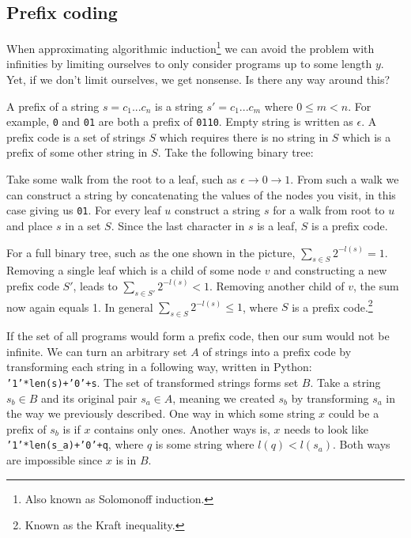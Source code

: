 \newpage

\subsection{Prefix coding} 

When approximating algorithmic induction\footnote{Also known as Solomonoff induction.} we can avoid the problem with infinities by limiting ourselves to only consider programs up to some length $y$.
Yet, if we don't limit ourselves, we get nonsense.
Is there any way around this?

A prefix of a string $s = c_1...c_n$ is a string $s' = c_1...c_m$ where $0 \leq m < n$.
For example, \texttt{0} and \texttt{01} are both a prefix of \texttt{0110}.
Empty string is written as $\epsilon$.
A prefix code is a set of strings $S$ which requires there is no string in $S$ which is a prefix of some other string in $S$.
Take the following binary tree:

\begin{figure}[h]
	\centering
{}
\end{figure}

Take some walk from the root to a leaf, such as $\epsilon \rightarrow 0 \rightarrow 1$.
From such a walk we can construct a string by concatenating the values of the nodes you visit, in this case giving us \texttt{01}.
For every leaf $u$ construct a string $s$ for a walk from root to $u$ and place $s$ in a set $S$.
Since the last character in $s$ is a leaf, $S$ is a prefix code.

For a full binary tree, such as the one shown in the picture, $\sum_{s \in S} 2^{-l(s)} = 1$.
Removing a single leaf which is a child of some node $v$ and constructing a new prefix code $S'$, leads to $\sum_{s \in S'} 2^{-l(s)} < 1$.
Removing another child of $v$, the sum now again equals 1.
In general $\sum_{s \in S} 2^{-l(s)} \leq 1$, where $S$ is a prefix code.\footnote{Known as the Kraft inequality.}

If the set of all programs would form a prefix code, then our sum would not be infinite. 
We can turn an arbitrary set $A$ of strings into a prefix code by transforming each string in a following way, written in Python: \texttt{'1'*len(s)+'0'+s}. 
The set of transformed strings forms set $B$. 
Take a string $s_b \in B$ and its original pair $s_a \in A$, meaning we created $s_b$ by transforming $s_a$ in the way we previously described. 
One way in which some string $x$ could be a prefix of $s_b$ is if $x$ contains only ones. 
Another ways is, $x$ needs to look like \texttt{'1'*len(s\_a)+'0'+q}, where $q$ is some string where $l(q) < l(s_a)$.
Both ways are impossible since $x$ is in $B$.

